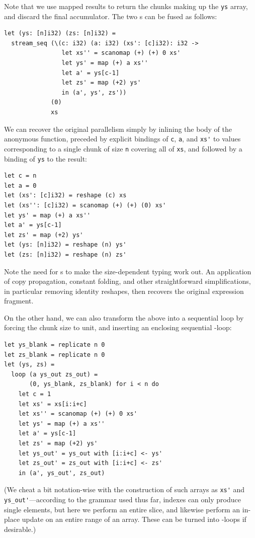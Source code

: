 Note that we use mapped results to return the chunks making up the
\texttt{ys} array, and discard the final accumulator.  The two
\StreamSeq{}s can be fused as follows:

\begin{lstlisting}
let (ys: [n]i32) (zs: [n]i32) =
  stream_seq (\(c: i32) (a: i32) (xs': [c]i32): i32 ->
                let xs'' = scanomap (+) (+) 0 xs'
                let ys' = map (+) a xs''
                let a' = ys[c-1]
                let zs' = map (+2) ys'
                in (a', ys', zs'))
             (0)
             xs
\end{lstlisting}

We can recover the original parallelism simply by inlining the body of
the anonymous function, preceded by explicit bindings of
\lstinline{c}, \lstinline{a}, and \lstinline{xs'} to values
corresponding to a single chunk of size \texttt{n} covering all of
\lstinline{xs}, and followed by a binding of \lstinline{ys} to the
result:

\begin{lstlisting}
let c = n
let a = 0
let (xs': [c]i32) = reshape (c) xs
let (xs'': [c]i32) = scanomap (+) (+) (0) xs'
let ys' = map (+) a xs''
let a' = ys[c-1]
let zs' = map (+2) ys'
let (ys: [n]i32) = reshape (n) ys'
let (zs: [n]i32) = reshape (n) zs'
\end{lstlisting}

Note the need for s to make the size-dependent typing work
out.  An application of copy propagation, constant folding, and other
straightforward simplifications, in particular removing identity
reshapes, then recovers the original expression fragment.

On the other hand, we can also transform the above \StreamSeq{} into a
sequential loop by forcing the chunk size to unit, and inserting an
enclosing sequential -loop:

\begin{lstlisting}
let ys_blank = replicate n 0
let zs_blank = replicate n 0
let (ys, zs) =
  loop (a ys_out zs_out) =
       (0, ys_blank, zs_blank) for i < n do
    let c = 1
    let xs' = xs[i:i+c]
    let xs'' = scanomap (+) (+) 0 xs'
    let ys' = map (+) a xs''
    let a' = ys[c-1]
    let zs' = map (+2) ys'
    let ys_out' = ys_out with [i:i+c] <- ys'
    let zs_out' = zs_out with [i:i+c] <- zs'
    in (a', ys_out', zs_out)
\end{lstlisting}

(We cheat a bit notation-wise with the construction of such arrays as
\lstinline{xs'} and \lstinline{ys_out'}---according to the grammar
used thus far, indexes can only produce single elements, but here we
perform an entire slice, and likewise perform an in-place update on an
entire range of an array.  These can be turned into -loops if
desirable.)

